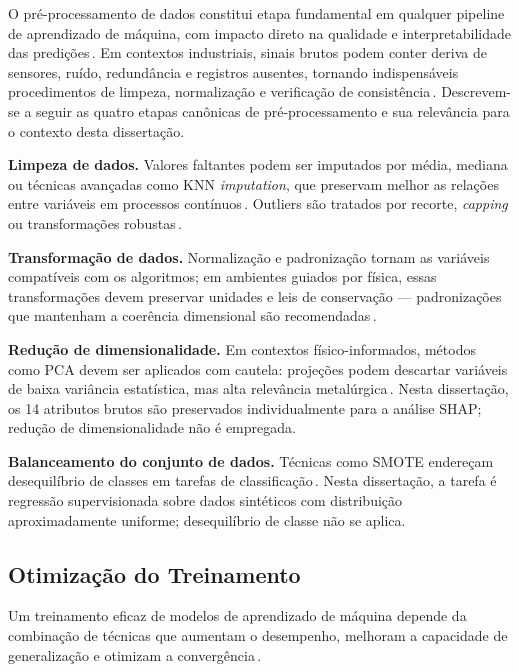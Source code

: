 O pré-processamento de dados constitui etapa fundamental em qualquer pipeline de aprendizado de máquina, com impacto direto na qualidade e interpretabilidade das predições\,\cite{kuhn2013applied}. Em contextos industriais, sinais brutos podem conter deriva de sensores, ruído, redundância e registros ausentes, tornando indispensáveis procedimentos de limpeza, normalização e verificação de consistência\,\cite{rahm2000data,hodge2004survey}. Descrevem-se a seguir as quatro etapas canônicas de pré-processamento e sua relevância para o contexto desta dissertação.

\textbf{Limpeza de dados.} Valores faltantes podem ser imputados por média, mediana ou técnicas avançadas como KNN \textit{imputation}, que preservam melhor as relações entre variáveis em processos contínuos\,\cite{kuhn2013applied,ding2011knnimpute}. Outliers são tratados por recorte, \textit{capping} ou transformações robustas\,\cite{aggarwal2015outlier,hodge2004survey}.

\textbf{Transformação de dados.} Normalização e padronização tornam as variáveis compatíveis com os algoritmos; em ambientes guiados por física, essas transformações devem preservar unidades e leis de conservação --- padronizações que mantenham a coerência dimensional são recomendadas\,\cite{kuhn2013applied,brunton2019ddse,willard2020integrating}.

\textbf{Redução de dimensionalidade.} Em contextos físico-informados, métodos como PCA devem ser aplicados com cautela: projeções podem descartar variáveis de baixa variância estatística, mas alta relevância metalúrgica\,\cite{jolliffe2016pca}. Nesta dissertação, os 14 atributos brutos são preservados individualmente para a análise SHAP; redução de dimensionalidade não é empregada.

\textbf{Balanceamento do conjunto de dados.} Técnicas como SMOTE endereçam desequilíbrio de classes em tarefas de classificação\,\cite{chawla2002smote,buda2018systematic}. Nesta dissertação, a tarefa é regressão supervisionada sobre dados sintéticos com distribuição aproximadamente uniforme; desequilíbrio de classe não se aplica.

\subsection{Otimização do Treinamento}
\label{subsec:otimizacao-treinamento}

Um treinamento eficaz de modelos de aprendizado de máquina depende da combinação de técnicas que aumentam o desempenho, melhoram a capacidade de generalização e otimizam a convergência\,\cite{goodfellow2016deep}.

